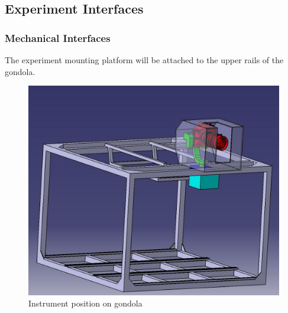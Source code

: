 \subsection{Experiment Interfaces}

\subsubsection{Mechanical Interfaces}
\label{sec:4.2.1}
The experiment mounting platform will be attached to the upper rails of the gondola.



\begin{figure}[H]
    \centering
	\includegraphics[scale=.8]{4-experiment-design/img/interfaces/Screenshot_Experiment.jpg}
	\caption{Instrument position on gondola}
\end{figure}

